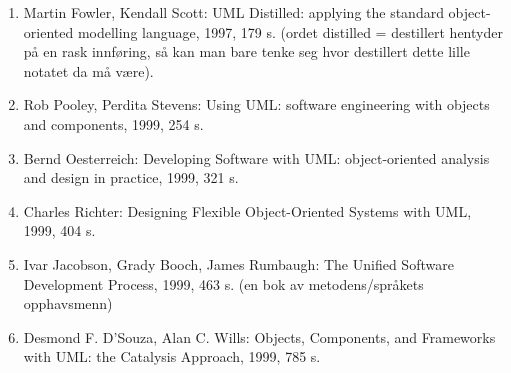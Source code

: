 \begin{enumerate}

\item
Martin Fowler, Kendall Scott: UML Distilled: applying the standard object-oriented modelling language, 1997, 179 s. (ordet distilled = destillert hentyder på en rask innføring, så kan man bare tenke seg hvor destillert dette lille notatet da må være).

\item
Rob Pooley, Perdita Stevens: Using UML: software engineering with objects and components, 1999, 254 s.

\item
Bernd Oesterreich: Developing Software with UML: object-oriented analysis and design in practice, 1999, 321 s.

\item
Charles Richter: Designing Flexible Object-Oriented Systems with UML, 1999, 404 s.

\item
Ivar Jacobson, Grady Booch, James Rumbaugh: The Unified Software Development Process, 1999, 463 s. (en bok av metodens/språkets opphavsmenn)

\item
Desmond F. D’Souza, Alan C. Wills: Objects, Components, and Frameworks with UML: the Catalysis Approach, 1999, 785 s.

\end{enumerate}
